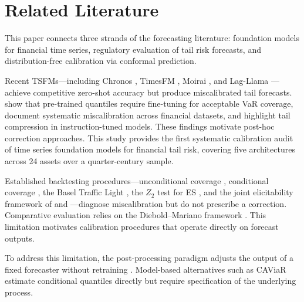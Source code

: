 \documentclass[preprint,11pt,authoryear]{elsarticle}
\newcommand{\1}{\boldsymbol{1}}
\begin{document}
	
	\section{Related Literature}
	\label{sec:lit}
	
	This paper connects three strands of the forecasting literature:
	foundation models for financial time series, regulatory
	evaluation of tail risk forecasts, and distribution-free
	calibration via conformal prediction.
	
	Recent TSFMs---including Chronos
	\citep{ansari2024chronos,ansari2025chronos2}, TimesFM
	\citep{das2024timesfm}, Moirai
	\citep{woo2024moirai,liu2024moirai2}, and Lag-Llama
	\citep{rasul2024lagllama}---achieve competitive zero-shot
	accuracy but produce miscalibrated tail forecasts.
	\citet{goel2024tsfmvar} show that pre-trained quantiles
	require fine-tuning for acceptable VaR coverage,
	\citet{rahimikia2025revisiting} document systematic
	miscalibration across financial datasets, and
	\citet{pele2025llmvar} highlight tail compression in
	instruction-tuned models. These findings motivate post-hoc
	correction approaches. This study provides the first systematic
	calibration audit of time series foundation models for financial
	tail risk, covering five architectures across 24 assets over a
	quarter-century sample.

	Established backtesting procedures---unconditional coverage
	\citep{kupiec1995}, conditional coverage
	\citep{christoffersen1998}, the Basel Traffic Light
	\citep{basel1996}, the $Z_2$ test for ES
	\citep{acerbi2014back}, and the joint elicitability framework
	of \citet{fissler2016higher} and
	\citet{nolde2017elicitability}---diagnose miscalibration but
	do not prescribe a correction. Comparative evaluation relies
	on the Diebold--Mariano framework
	\citep{diebold1995comparing,harvey1997testing}. This
	limitation motivates calibration procedures that operate
	directly on forecast outputs.
	
	To address this limitation, the post-processing paradigm adjusts
	the output of a fixed forecaster without retraining
	\citep{gneiting2013combining, brehmer2021properification,
		taillardat2016calibrated}. Model-based
	alternatives such as CAViaR \citep{engle2004caviar} estimate
	conditional quantiles directly but require specification of
	the underlying process.
	
\end{document}
